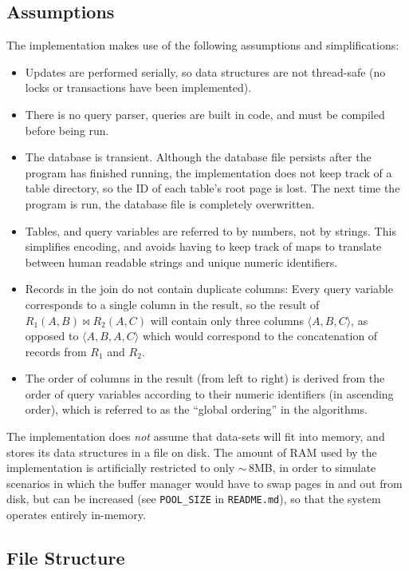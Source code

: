 \subsection{Assumptions}\label{sec:q-2-ass}

The implementation makes use of the following assumptions and simplifications:

\begin{itemize}
  \item Updates are performed serially, so data structures are not thread-safe (no locks or transactions have been implemented).
  \item There is no query parser, queries are built in code, and must be compiled before being run.
  \item The database is transient. Although the database file persists after the program has finished running, the implementation does not keep track of a table directory, so the ID of each table's root page is lost. The next time the program is run, the database file is completely overwritten.
  \item Tables, and query variables are referred to by numbers, not by strings. This simplifies encoding, and avoids having to keep track of maps to translate between human readable strings and unique numeric identifiers.
  \item Records in the join do not contain duplicate columns: Every query variable corresponds to a single column in the result, so the result of $R_1(A,B)\bowtie R_2(A,C)$ will contain only three columns $\langle A, B, C\rangle$, as opposed to $\langle A, B, A, C\rangle$ which would correspond to the concatenation of records from $R_1$ and $R_2$.
  \item The order of columns in the result (from left to right) is derived from the order of query variables according to their numeric identifiers (in ascending order), which is referred to as the ``global ordering'' in the algorithms.
\end{itemize}

The implementation does \textit{not} assume that data-sets will fit into memory, and stores its data structures in a file on disk. The amount of RAM used by the implementation is artificially restricted to only $\sim\,$8MB, in order to simulate scenarios in which the buffer manager would have to swap pages in and out from disk, but can be increased (see \texttt{POOL\_SIZE} in \texttt{README.md}), so that the system operates entirely in-memory.

\subsection{File Structure}\label{sec:q-2-struct}

